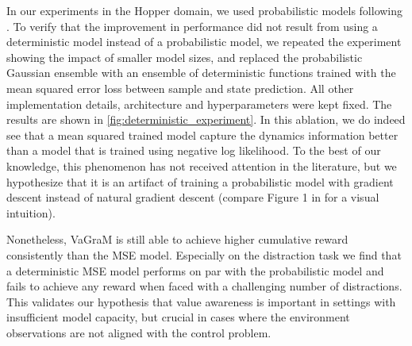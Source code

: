 In our experiments in the Hopper domain, we used probabilistic models following \textcite{mbpo}. 
To verify that the improvement in performance did not result from using a deterministic model instead of a probabilistic model, we repeated the experiment showing the impact of smaller model sizes, and replaced the probabilistic Gaussian ensemble with an ensemble of deterministic functions trained with the mean squared error loss between sample and state prediction.
All other implementation details, architecture and hyperparameters were kept fixed. The results are shown in \autoref{fig:deterministic_experiment}.
In this ablation, we do indeed see that a mean squared trained model capture the dynamics information better than a model that is trained using negative log likelihood.
To the best of our knowledge, this phenomenon has not received attention in the literature, but we hypothesize that it is an artifact of training a probabilistic model with gradient descent instead of natural gradient descent (compare Figure 1 in \textcite{peters2008natural} for a visual intuition).

Nonetheless, VaGraM is still able to achieve higher cumulative reward consistently than the MSE model. 
Especially on the distraction task we find that a deterministic MSE model performs on par with the probabilistic model and fails to achieve any reward when faced with a challenging number of distractions. 
This validates our hypothesis that value awareness is important in settings with insufficient model capacity, but crucial in cases where the environment observations are not aligned with the control problem.

